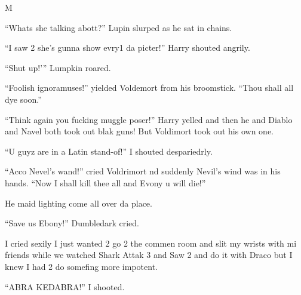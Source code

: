 M\documentclass{article}
\begin{document}
“Whats she talking abott?” Lupin slurped as he sat in chains.

“I saw 2 she’s gunna show evry1 da picter!” Harry shouted angrily.

“Shut up!’” Lumpkin roared.

“Foolish ignoramuses!” yielded Voldemort from his broomstick. “Thou shall all dye soon.”

“Think again you fucking muggle poser!” Harry yelled and then he and Diablo and Navel both took out blak guns! But Voldimort took out his own one.

“U guyz are in a Latin stand-of!” I shouted despariedrly.

“Acco Nevel’s wand!” cried Voldrimort nd suddenly Nevil’s wind was in his hands. “Now I shall kill thee all and Evony u will die!”

He maid lighting come all over da place.

“Save us Ebony!” Dumbledark cried.

I cried sexily I just wanted 2 go 2 the commen room and slit my wrists with mi friends while we watched Shark Attak 3 and Saw 2 and do it with Draco but I knew I had 2 do somefing more impotent.

“ABRA KEDABRA!” I shooted.
\end{document}
